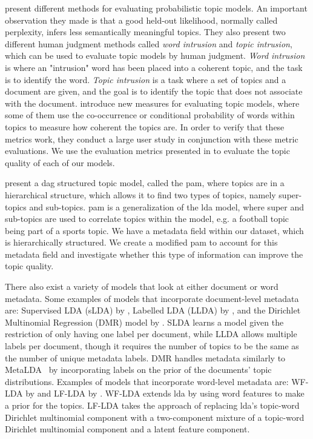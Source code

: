 \citet{tea_leaves} present different methods for evaluating probabilistic topic models. 
An important observation they made is that a good held-out likelihood, normally called perplexity, infers less semantically meaningful topics.
They also present two different human judgment methods called \emph{word intrusion} and \emph{topic intrusion}, which can be used to evaluate topic models by human judgment. 
\emph{Word intrusion} is where an "intrusion" word has been placed into a coherent topic, and the task is to identify the word.
\emph{Topic intrusion} is a task where a set of topics and a document are given, and the goal is to identify the topic that does not associate with the document. 
\citet{topic_coherence_2015} introduce new measures for evaluating topic models, where some of them use the co-occurrence or conditional probability of words within topics to measure how coherent the topics are. 
In order to verify that these metrics work, they conduct a large user study in conjunction with these metric evaluations.
We use the evaluation metrics presented in \citet{topic_coherence_2015} to evaluate the topic quality of each of our models.

\citet{li2006pachinko} present a \gls{dag} structured topic model, called the \acrfull{pam}, where topics are in a hierarchical structure, which allows it to find two types of topics, namely super-topics and sub-topics. 
\Gls{pam} is a generalization of the \gls{lda} model, where super and sub-topics are used to correlate topics within the model, e.g. a football topic being part of a sports topic.
We have a metadata field within our dataset, which is hierarchically structured. 
We create a modified \gls{pam} to account for this metadata field and investigate whether this type of information can improve the topic quality.

There also exist a variety of models that look at either document or word metadata.
Some examples of models that incorporate document-level metadata are: Supervised LDA (sLDA) by \citet{blei2010supervised}, Labelled LDA (LLDA) by \citet{llda2009}, and the Dirichlet Multinomial Regression (DMR) model by \citet{mimno2008topic}.
SLDA learns a model given the restriction of only having one label per document, while LLDA allows multiple labels per document, though it requires the number of topics to be the same as the number of unique metadata labels.
DMR handles metadata similarly to MetaLDA~\cite{MetaLDA2017} by incorporating labels on the prior of the documents' topic distributions.
Examples of models that incorporate word-level metadata are: WF-LDA by \citet{wf-lda2010} and LF-LDA by \citet{lf-lda2015}.
WF-LDA extends \gls{lda} by using word features to make a prior for the topics.
LF-LDA takes the approach of replacing \gls{lda}'s topic-word Dirichlet multinomial component with a two-component mixture of a topic-word Dirichlet multinomial component and a latent feature component.

